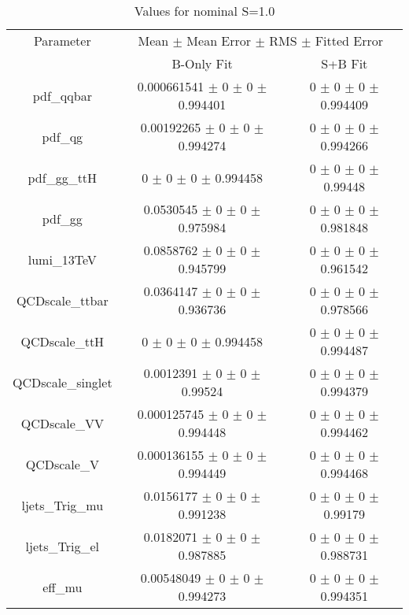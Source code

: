 \begin{table}
\centering
\caption{Values for nominal S=1.0}
\begin{tabular}{ccc}
\toprule
Parameter 	& \multicolumn{2}{c}{Mean $\pm$ Mean Error $\pm$ RMS $\pm$ Fitted Error}\\
 	& B-Only Fit & S+B Fit\\
\midrule
pdf\_qqbar 	& \num{0.000661541} $\pm$ \num{0} $\pm$ \num{0} $\pm$ \num{0.994401} 	& \num{0} $\pm$ \num{0} $\pm$ \num{0} $\pm$ \num{0.994409}\\
pdf\_qg 	& \num{0.00192265} $\pm$ \num{0} $\pm$ \num{0} $\pm$ \num{0.994274} 	& \num{0} $\pm$ \num{0} $\pm$ \num{0} $\pm$ \num{0.994266}\\
pdf\_gg\_ttH 	& \num{0} $\pm$ \num{0} $\pm$ \num{0} $\pm$ \num{0.994458} 	& \num{0} $\pm$ \num{0} $\pm$ \num{0} $\pm$ \num{0.99448}\\
pdf\_gg 	& \num{0.0530545} $\pm$ \num{0} $\pm$ \num{0} $\pm$ \num{0.975984} 	& \num{0} $\pm$ \num{0} $\pm$ \num{0} $\pm$ \num{0.981848}\\
lumi\_13TeV 	& \num{0.0858762} $\pm$ \num{0} $\pm$ \num{0} $\pm$ \num{0.945799} 	& \num{0} $\pm$ \num{0} $\pm$ \num{0} $\pm$ \num{0.961542}\\
QCDscale\_ttbar 	& \num{0.0364147} $\pm$ \num{0} $\pm$ \num{0} $\pm$ \num{0.936736} 	& \num{0} $\pm$ \num{0} $\pm$ \num{0} $\pm$ \num{0.978566}\\
QCDscale\_ttH 	& \num{0} $\pm$ \num{0} $\pm$ \num{0} $\pm$ \num{0.994458} 	& \num{0} $\pm$ \num{0} $\pm$ \num{0} $\pm$ \num{0.994487}\\
QCDscale\_singlet 	& \num{0.0012391} $\pm$ \num{0} $\pm$ \num{0} $\pm$ \num{0.99524} 	& \num{0} $\pm$ \num{0} $\pm$ \num{0} $\pm$ \num{0.994379}\\
QCDscale\_VV 	& \num{0.000125745} $\pm$ \num{0} $\pm$ \num{0} $\pm$ \num{0.994448} 	& \num{0} $\pm$ \num{0} $\pm$ \num{0} $\pm$ \num{0.994462}\\
QCDscale\_V 	& \num{0.000136155} $\pm$ \num{0} $\pm$ \num{0} $\pm$ \num{0.994449} 	& \num{0} $\pm$ \num{0} $\pm$ \num{0} $\pm$ \num{0.994468}\\
ljets\_Trig\_mu 	& \num{0.0156177} $\pm$ \num{0} $\pm$ \num{0} $\pm$ \num{0.991238} 	& \num{0} $\pm$ \num{0} $\pm$ \num{0} $\pm$ \num{0.99179}\\
ljets\_Trig\_el 	& \num{0.0182071} $\pm$ \num{0} $\pm$ \num{0} $\pm$ \num{0.987885} 	& \num{0} $\pm$ \num{0} $\pm$ \num{0} $\pm$ \num{0.988731}\\
eff\_mu 	& \num{0.00548049} $\pm$ \num{0} $\pm$ \num{0} $\pm$ \num{0.994273} 	& \num{0} $\pm$ \num{0} $\pm$ \num{0} $\pm$ \num{0.994351}\\

\end{tabular}
\end{table}
